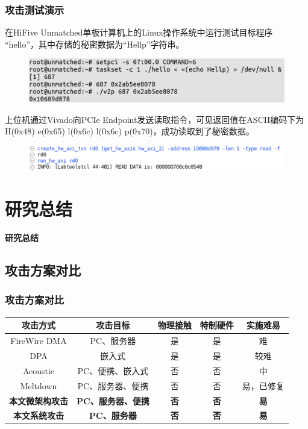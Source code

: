 \documentclass[presentation,aspectratio=169]{beamer}
\begin{document}
\begin{frame}
    \frametitle{攻击测试演示}
    在HiFive Unmatched单板计算机上的Linux操作系统中运行测试目标程序
    “hello”，其中存储的秘密数据为“Hellp”字符串。
    \begin{figure}[ht]
        \centering
        \includegraphics[width=\textwidth]{../paper/figs/unmatched.png}
    \end{figure}
    上位机通过Vivado向PCIe Endpoint发送读取指令，可见返回值在ASCII编码下为
    H(0x48) e(0x65) l(0x6c) l(0x6c) p(0x70)，成功读取到了秘密数据。
    \begin{figure}[ht]
        \centering
        \includegraphics[width=\textwidth]{../paper/figs/vivado.png}
    \end{figure}
\end{frame}




\section{研究总结}

\begin{frame}{}
    \centering
    \Huge\bfseries\textcolor{xmucolor}{研究总结}
\end{frame}

\subsection{攻击方案对比}
\begin{frame}
\frametitle{攻击方案对比}
\begin{table}
    \begin{tabular}{ccccc}
        \toprule
        攻击方式 & 攻击目标 & 物理接触 & 特制硬件 & 实施难易 \\
        \midrule
        FireWire DMA\cite{becher2005firewire} & PC、服务器 & 是 & 是 & 难 \\
        DPA\cite{kocher1999differential} & 嵌入式 & 是 & 是 & 较难 \\
        Acoustic\cite{acoustic} & PC、便携、嵌入式 & 否 & 否 & 中 \\
        Meltdown\cite{lipp_meltdown_2018} & PC、服务器、便携 & 否 & 否 & 易，已修复 \\
        \textbf{本文微架构攻击} & \textbf{PC、服务器、便携} & \textbf{否} & \textbf{否} & \textbf{易} \\
        \textbf{本文系统攻击} & \textbf{PC、服务器} & \textbf{否} & \textbf{否} & \textbf{易} \\
        \bottomrule
    \end{tabular}
\end{table}
\end{frame}
\end{document}
